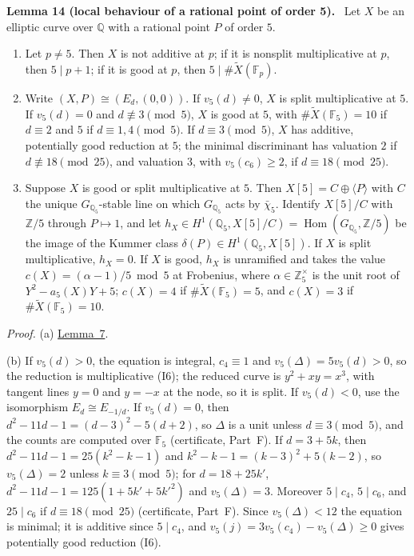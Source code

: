 \documentclass[11pt]{article}
\newenvironment{statement}[1]{\par\medskip\noindent\phantomsection\textbf{#1}\ }{\par\medskip}
\newcommand{\Q}{\mathbb Q}
\newcommand{\Z}{\mathbb Z}
\newcommand{\F}{\mathbb F}
\DeclareMathOperator{\Hom}{Hom}
\begin{document}
\begin{statement}{Lemma 14 (local behaviour of a rational point of order 5).}\label{lemma-five}
Let \(X\) be an elliptic curve over \(\Q\) with a rational point \(P\) of order \(5\).
\begin{enumerate}
\item[(a)] Let \(p\neq5\). Then \(X\) is not additive at \(p\); if it is nonsplit multiplicative at \(p\), then
\(5\mid p+1\); if it is good at \(p\), then \(5\mid\#\widetilde X(\F_p)\).
\item[(b)] Write \((X,P)\cong(E_d,(0,0))\). If \(v_5(d)\neq0\), \(X\) is split multiplicative at \(5\). If
\(v_5(d)=0\) and \(d\not\equiv3\pmod5\), \(X\) is good at \(5\), with \(\#\widetilde X(\F_5)=10\) if \(d\equiv2\)
and \(5\) if \(d\equiv1,4\pmod5\). If \(d\equiv3\pmod5\), \(X\) has additive, potentially good reduction at \(5\);
the minimal discriminant has valuation \(2\) if \(d\not\equiv18\pmod{25}\), and valuation \(3\), with
\(v_5(c_6)\ge2\), if \(d\equiv18\pmod{25}\).
\item[(c)] Suppose \(X\) is good or split multiplicative at \(5\). Then \(X[5]=C\oplus\langle P\rangle\) with \(C\)
the unique \(G_{\Q_5}\)-stable line on which \(G_{\Q_5}\) acts by \(\bar\chi_5\). Identify \(X[5]/C\) with \(\Z/5\)
through \(P\mapsto1\), and let \(h_X\in H^1(\Q_5,X[5]/C)=\Hom(G_{\Q_5},\Z/5)\) be the image of the Kummer class
\(\delta(P)\in H^1(\Q_5,X[5])\). If \(X\) is split multiplicative, \(h_X=0\). If \(X\) is good, \(h_X\) is
unramified and takes the value \(c(X)=(\alpha-1)/5\bmod5\) at Frobenius, where \(\alpha\in\Z_5^\times\) is the
unit root of \(Y^2-a_5(X)Y+5\); \(c(X)=4\) if \(\#\widetilde X(\F_5)=5\), and \(c(X)=3\) if
\(\#\widetilde X(\F_5)=10\).
\end{enumerate}
\end{statement}

\emph{Proof.} (a) \hyperref[lemma-localtorsion]{Lemma~7}.

(b) If \(v_5(d)>0\), the equation is integral, \(c_4\equiv1\) and \(v_5(\Delta)=5v_5(d)>0\), so the reduction is
multiplicative (I6); the reduced curve is \(y^2+xy=x^3\), with tangent lines \(y=0\) and \(y=-x\) at the node, so it
is split. If \(v_5(d)<0\), use the isomorphism \(E_d\cong E_{-1/d}\). If \(v_5(d)=0\), then \(d^2-11d-1=(d-3)^2-5(d+2)\), so
\(\Delta\) is a unit unless \(d\equiv3\pmod5\), and the counts are computed over \(\F_5\) (certificate, Part~F). If
\(d=3+5k\), then \(d^2-11d-1=25(k^2-k-1)\) and \(k^2-k-1=(k-3)^2+5(k-2)\), so \(v_5(\Delta)=2\) unless
\(k\equiv3\pmod5\); for \(d=18+25k'\), \(d^2-11d-1=125(1+5k'+5k'^2)\) and \(v_5(\Delta)=3\). Moreover
\(5\mid c_4\), \(5\mid c_6\), and \(25\mid c_6\) if \(d\equiv18\pmod{25}\) (certificate, Part~F). Since
\(v_5(\Delta)<12\) the equation is minimal; it is additive since \(5\mid c_4\), and \(v_5(j)=3v_5(c_4)-v_5(\Delta)\ge0\)
gives potentially good reduction (I6).
\end{document}
